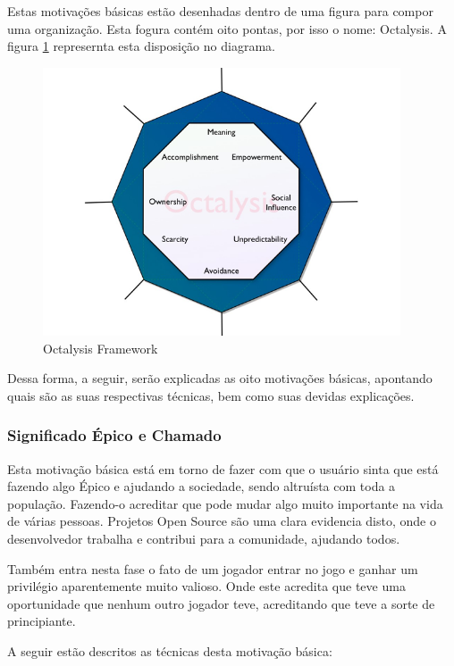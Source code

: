 Estas motivações básicas estão desenhadas dentro de uma figura para
compor uma organização. Esta fogura contém oito pontas, por isso o nome:
Octalysis. A figura \ref{fig:octalysisframework} represernta esta
disposição no diagrama.

\begin{figure}[h]
    \centering
    \includegraphics[width=400px, scale=1]{figuras/octalysisframework}
    \caption{Octalysis Framework}
    \label{fig:octalysisframework}
\end{figure}

Dessa forma, a seguir, serão explicadas as oito motivações básicas,
apontando quais são as suas respectivas técnicas, bem como
suas devidas explicações.

\subsubsection{Significado Épico e Chamado}
\label{sub:significadoepico}
Esta motivação básica está em torno de fazer com que o usuário sinta que
está fazendo algo Épico e ajudando a sociedade, sendo altruísta com toda
a população. Fazendo-o acreditar que pode mudar algo muito importante
na vida de várias pessoas. Projetos Open Source são uma clara evidencia
disto, onde o desenvolvedor trabalha e contribui para a comunidade, ajudando
todos.

Também entra nesta fase o fato de um jogador entrar no jogo e ganhar um
privilégio aparentemente muito valioso. Onde este acredita que teve uma
oportunidade que nenhum outro jogador teve, acreditando que teve a sorte de
principiante.

A seguir estão descritos as técnicas desta motivação básica:

